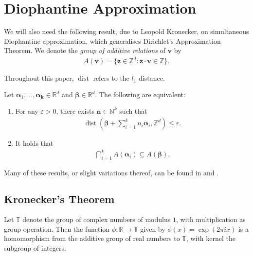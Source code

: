 
\section{Diophantine Approximation}

We will also need the following result, due to Leopold Kronecker, on simultaneous Diophantine approximation, which generalises Dirichlet's Approximation Theorem. We denote the \emph{group of additive relations} of $\boldsymbol{v}$ by
\begin{align*}
A(\boldsymbol{v}) = \lbrace \boldsymbol{z} \in \mathbb{Z}^{d} : \boldsymbol{z} \cdot \boldsymbol{v} \in \mathbb{Z} \rbrace .
\end{align*}

Throughout this paper, $\operatorname{dist}$ refers to the $l_{1}$ distance.

\begin{theorem}[Kronecker]
\label{Kronecker}
Let $\boldsymbol{\alpha}_{1}, \ldots, \boldsymbol{\alpha_{k}} \in \mathbb{R}^{d}$ and $\boldsymbol{\beta} \in \mathbb{R}^{d}$. The following are equivalent:
\begin{enumerate}
\item For any $\varepsilon > 0$, there exists $\boldsymbol{n} \in \mathbb{N}^{k}$ such that
\begin{align*}
\operatorname{dist}(\boldsymbol{\beta} + \sum\limits_{i=1}^{k} n_{i} \boldsymbol{\alpha}_{i}, \mathbb{Z}^{d}) \leq \varepsilon .
\end{align*}
\item It holds that
\begin{align*}
\bigcap\limits_{i=1}^{k} A(\boldsymbol{\alpha}_{i}) \subseteq A(\boldsymbol{\beta}) .
\end{align*}
\end{enumerate}
\end{theorem}

Many of these results, or slight variations thereof, can be found in \cite{HardyAndWright} and \cite{Cassels}.




\subsection{Kronecker's Theorem}
Let $\mathbb{T}$ denote the group of complex numbers of modulus $1$,
with multiplication as group operation.  Then the function
$\phi:\mathbb{R} \rightarrow \mathbb{T}$ given by
$\phi(x)=\exp(2\pi i x)$ is a homomorphism from the additive
group of real numbers to $\mathbb{T}$, with kernel the subgroup of
integers.

